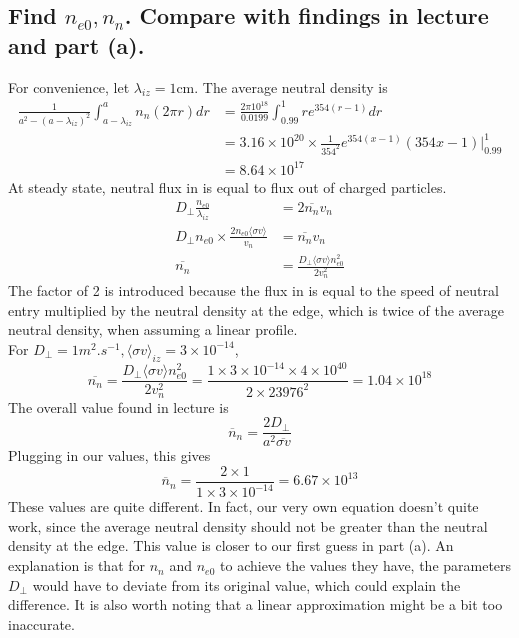 \documentclass[answers]{exam}
\begin{document}
\begin{questions}
\begin{parts}

\part{Find $n_{e0}, n_n$. Compare with findings in lecture and part (a).}

\begin{solution}
    For convenience, let $\lambda_{iz} = 1$cm. The average neutral density is
    \begin{align*}
        \frac{1}{a^2 - (a - \lambda_{iz})^2}\int_{a-\lambda_{iz}}^a n_n (2\pi r) dr &= \frac{2\pi10^{18}}{0.0199} \int_0.99^1 re^{354(r-1)}dr \\
                                                                                    &= 3.16 \times 10^{20} \times \frac{1}{354^2} e^{354(x-1)}(354x-1) \Big |_{0.99}^1 \\
                                                                                    &= 8.64 \times 10^{17}
    \end{align*}
    At steady state, neutral flux in is equal to flux out of charged particles.
    \begin{align*}
        D_\perp \frac{n_{e0}}{\lambda_{iz}} &= 2\overline{n_n} v_n \\
        D_\perp n_{e0} \times \frac{2n_{e0}\langle \sigma v\rangle}{v_n} &= \overline{n_n} v_n \\
        \overline{n_n} &= \frac{D_\perp \langle \sigma v\rangle n_{e0}^2}{2v_n^2}
    \end{align*}
    The factor of 2 is introduced because the flux in is equal to the speed of neutral entry multiplied by the neutral density at the edge, which is twice of the average neutral density, when assuming a linear profile. \\
    For $D_\perp = 1 \unit{m^2.s^{-1}}, \langle \sigma v\rangle_{iz} = 3 \times 10^{-14}$,
    $$\overline{n_n} = \frac{D_\perp \langle \sigma v\rangle n_{e0}^2}{2v_n^2} = \frac{1 \times 3 \times 10^{-14} \times 4 \times 10^{40}}{2 \times 23976^2} = 1.04 \times 10^{18}$$
    The overall value found in lecture is
    $$\overline n_n = \frac{2D_\perp}{a^2\overline{\sigma v}}$$
    Plugging in our values, this gives
    $$\overline n_n = \frac{2 \times 1}{1 \times 3 \times 10^{-14}} = 6.67 \times 10^{13}$$
    These values are quite different. In fact, our very own equation doesn't quite work, since the average neutral density should not be greater than the neutral density at the edge. This value is closer to our first guess in part (a). An explanation is that for $n_n$ and $n_{e0}$ to achieve the values they have, the parameters $D_\perp$ would have to deviate from its original value, which could explain the difference. It is also worth noting that a linear approximation might be a bit too inaccurate.
\end{solution}


\end{parts}
\end{questions}
\end{document}
